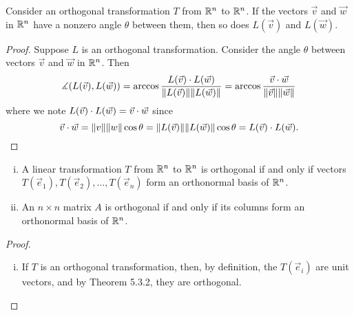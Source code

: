 \documentclass[a4paper,11pt]{article}
\begin{document}
\begin{outline}
    Consider an orthogonal transformation \(T\) from \(\mathbb{R}^n\) to \(\mathbb{R}^n\). If the vectors \(\vec{v}\) and \(\vec{w}\) in
    \(\mathbb{R}^n\) have a nonzero angle \(\theta\) between them, then so does \(L(\vec{v})\) and \(L(\vec{w})\).

    \begin{proof}
      Suppose \(L\) is an orthogonal transformation. Consider the angle \(\theta\) between vectors \(\vec{v}\) and \(\vec{w}\)
      in \(\mathbb{R}^n\). Then
      \[
        \measuredangle (L(\vec{v}), L(\vec{w}))
          = \arccos{\frac{L(\vec{v})\cdot L(\vec{w})}{\|L(\vec{v})\|\|L(\vec{w})\|}}
          = \arccos{\frac{\vec{v}\cdot\vec{w}}{\|\vec{v}\|\|\vec{w}\|}}
      \]
      where we note \(L(\vec{v})\cdot L(\vec{w}) = \vec{v}\cdot\vec{w}\) since
      \[
        \vec{v}\cdot\vec{w} = \|v\|\|w\|\cos{\theta} = \|L(\vec{v})\|\|L(\vec{w})\|\cos{\theta} = L(\vec{v})\cdot L(\vec{w})\text{.}
      \]

    \end{proof}

    \begin{enumerate}[i.]
      \item
        A linear transformation \(T\) from \(\mathbb{R}^n\) to \(\mathbb{R}^n\) is orthogonal if and only if vectors \(T(\vec{e}_1),
        T(\vec{e}_2), \ldots, T(\vec{e}_n)\) form an orthonormal basis of \(\mathbb{R}^n\).
      \item
        An \(n\times n\) matrix \(A\) is orthogonal if and only if its columns form an orthonormal basis of \(\mathbb{R}^n\).
    \end{enumerate}

    \begin{proof}
      \begin{enumerate}[i.]
        \item
          \forward If \(T\) is an orthogonal transformation, then, by definition, the \(T(\vec{e}_i)\) are unit vectors, and by
          Theorem 5.3.2, they are orthogonal.


\end{enumerate}
\end{proof}
\end{outline}
\end{document}
